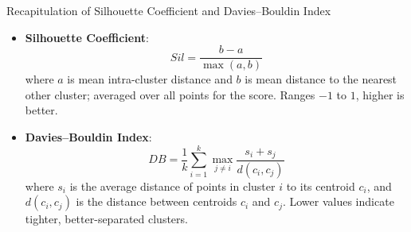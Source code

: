 \documentclass[10pt,aspectratio=169]{beamer}
\newcommand{\sil}{\textit{Sil}}
\newcommand{\db}{\textit{DB}}
\begin{document}
\begin{frame}{Recapitulation of Silhouette Coefficient and Davies--Bouldin Index}
  \begin{itemize}
    \item \textbf{Silhouette Coefficient}:
    \[
      \sil = \frac{b - a}{\max(a,b)}
    \]
    where $a$ is mean intra-cluster distance and $b$ is mean distance to the nearest other cluster; averaged over all points for the score. Ranges $-1$ to $1$, higher is better.
    \item \textbf{Davies--Bouldin Index}:
    \[
      \db = \frac{1}{k}\sum_{i=1}^{k} \max_{j\neq i} \frac{s_i + s_j}{d(c_i, c_j)}
    \]
    where $s_i$ is the average distance of points in cluster $i$ to its centroid $c_i$, and $d(c_i, c_j)$ is the distance between centroids $c_i$ and $c_j$. Lower values indicate tighter, better-separated clusters.
  \end{itemize}
\end{frame}
\end{document}
